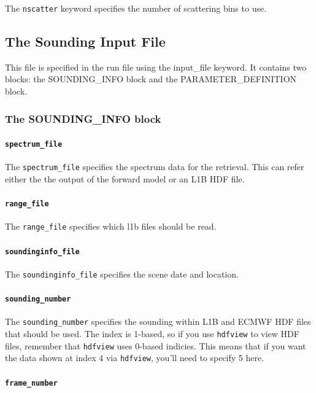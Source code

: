 \documentclass{article}
\begin{document}
The \texttt{nscatter} keyword specifies the number of scattering bins
to use.

\subsection{The Sounding Input File}

This file is specified in the run file using the input\_file keyword.
It contains two blocks: the SOUNDING\_INFO block and the
PARAMETER\_DEFINITION block.

\subsubsection{The SOUNDING\_INFO block}

\paragraph{\texttt{spectrum\_file}}

The \texttt{spectrum\_file} specifies the spectrum data for the retrieval.
This can refer either the the output of the forward model or an L1B HDF file.

\paragraph{\texttt{range\_file}}

The \texttt{range\_file} specifies which l1b files should be read.

\paragraph{\texttt{soundinginfo\_file}}

The \texttt{soundinginfo\_file} specifies the scene date and location.

\paragraph{\texttt{sounding\_number}}

The \texttt{sounding\_number} specifies the sounding within L1B and ECMWF HDF
  files that should be used. The index is 1-based, so if you use \texttt{hdfview} to
	view HDF files, remember that \texttt{hdfview} uses 0-based indicies. This means that
	if you want the data shown at index 4 via \texttt{hdfview}, you'll need to specify 5
	here.

\paragraph{\texttt{frame\_number}}
\end{document}
